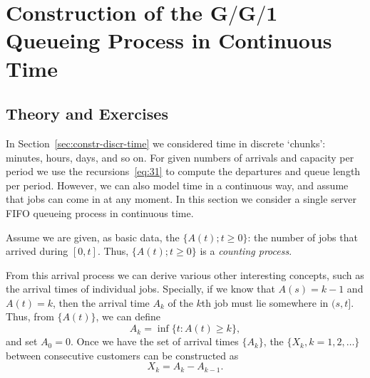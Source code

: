 \section
[Construction of the $G/G/1$ Queueing Process in Continuous Time]
{Construction of the $\mathbf{G/G/1}$ Queueing Process in Continuous Time}
\label{sec:constr-gg1-queu}

\subsection*{Theory and Exercises}


In Section~\ref{sec:constr-discr-time} we considered time in discrete `chunks':
minutes, hours, days, and so on. For given numbers of arrivals and
capacity per period we use the recursions~\eqref{eq:31} to
compute the departures and queue length per period.  However, we can also model time in a continuous way, and assume that jobs can come in at any moment.
In this section we consider a single server FIFO queueing process in continuous time. 

Assume we are given, as basic data, the 
$\{A(t); t\geq 0\}$: the number of jobs that arrived during $[0,t]$.
Thus, $\{A(t); t\geq 0\}$ is a \emph{counting process}.

From this arrival process we can derive various other interesting
concepts, such as the arrival times of individual jobs. Specially, if
we know that $A(s) = k-1$ and $A(t) = k$, then the arrival time $A_k$
of the $k$th job must lie somewhere in $(s,t]$. Thus, from $\{A(t)\}$, we can define
\begin{equation}\label{eq:27}
  A_k = \inf\{t: A(t) \geq k\},
\end{equation}
and set $A_0 = 0$. Once we have the set of arrival times $\{A_k\}$,
the  $\{X_k, k=1, 2, \ldots\}$ between
consecutive customers can be constructed as
\begin{equation}
  X_k = A_k - A_{k-1}.
\end{equation}


